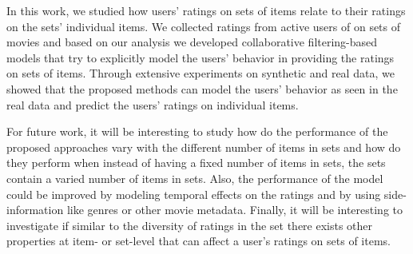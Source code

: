 
In this work, we studied how users' ratings on sets of items relate to their
ratings on the sets' individual items. 
We collected ratings from active users of \ML on sets of movies and based
on our analysis we developed collaborative filtering-based models that try to explicitly model the
users' behavior in providing the ratings on sets of items.
Through extensive experiments on synthetic and real data, we showed that the
proposed methods can model the users' behavior as seen in the real data and
predict the users' ratings on individual items.


For future work, it will be interesting to study how do the performance of the proposed
approaches vary with the different number of items in sets and how do they
perform when instead of having a fixed number of items in sets, the sets contain
a varied number of items in sets.
Also, the performance of the model could be improved by modeling
temporal effects on the ratings and by using side-information like genres or
other movie metadata. Finally, it will be interesting to investigate if similar to the diversity of
ratings in the set there exists other properties at item- or set-level
that can affect a user's ratings on sets of items.



